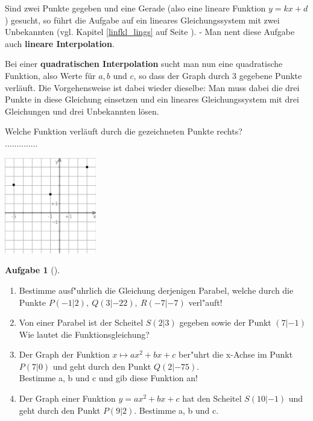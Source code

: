 \documentclass[a4paper, twoside, parskip, 10pt, smallheadings]{scrbook}
\theoremstyle{plain}
\theoremstyle{definition}
\newtheorem{Auf}{Aufgabe}%
\newenvironment{fshaded}{%
\def\FrameCommand{\fcolorbox{framecolor}{shadecolor}}%
\MakeFramed {\FrameRestore}}%
{\endMakeFramed}
\newenvironment{fauf}[1][]{\definecolor{shadecolor}{rgb}{.58,.788,1}%
\definecolor{framecolor}{rgb}{.13,.25,.9}%
\begin{fshaded}\begin{Auf}[#1]}{\end{Auf}\end{fshaded}}
\newcommand{\ba}{\begin{fauf}}
\newcommand{\ea}{\end{fauf}}
\newcommand{\bn}{\begin{enumerate}}
\newcommand{\en}{\end{enumerate}}
\begin{document}
\begin{minipage}{10cm}Sind zwei Punkte gegeben und eine Gerade (also eine lineare Funktion $y=kx+d$) gesucht, so führt die Aufgabe auf ein lineares Gleichungssystem mit zwei Unbekannten (vgl. Kapitel \ref{linfkl_lings} auf Seite \pageref{linfkl_lings}). - Man nent diese Aufgabe auch {\bf lineare Interpolation}.

Bei einer {\bf quadratischen Interpolation} sucht man nun eine quadratische Funktion, also Werte für $a,b$ und $c$, so dass der Graph durch 3 gegebene Punkte verläuft. Die Vorgehensweise ist dabei wieder dieselbe: Man muss dabei die drei Punkte in diese Gleichung einsetzen und  ein lineares Gleichungssystem mit drei Gleichungen und drei Unbekannten lösen.

Welche Funktion verläuft durch die  gezeichneten Punkte rechts?\\
		..............      
		\end{minipage} 
		\begin{minipage}{4cm}
		\includegraphics[width=4cm]{2te/quadratischefunktion/bilder/quadinterpol.jpg}
		\end{minipage}

\ba 
\bn \item Bestimme ausf"uhrlich die Gleichung derjenigen Parabel, welche durch
         die Punkte $P(-1|2),~Q(3|-22),~R(-7|-7)$ verl"auft!


\item Von einer Parabel ist der Scheitel $S(2|3)$ gegeben sowie der Punkt $(7|-1)$ Wie lautet die Funktionsgleichung?

\item
Der Graph der Funktion $x \mapsto ax^2 + bx + c$ ber"uhrt die x-Achse 
im Punkt $P(7|0)$ und geht durch den Punkt $Q(2|-75)$.\\
Bestimme a, b und c und gib diese Funktion an!

\item 
 
Der Graph einer Funktion $y=ax^2 + bx + c$ hat den Scheitel $S(10|-1)$
und geht durch den Punkt $P(9|2)$.
Bestimme a, b und c.
\en 
\ea 
\end{document}
